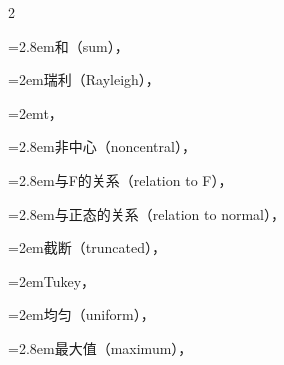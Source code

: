 \begin{multicols}{2}
\par\noindent\hangindent=2.8em\hspace*{1.8em}\label{idx:379}和（sum），\hyperref[thm:4.3.2]{\pageref*{thm:4.3.2}}\par
\par\noindent\hangindent=2em\hspace*{1em}\label{idx:380}瑞利（Rayleigh），\hyperref[idxocc:380:139]{\pageref*{idxocc:380:139}}\par
\par\noindent\hangindent=2em\hspace*{1em}\label{idx:381}t，\hyperref[def:5.3.4]{\pageref*{def:5.3.4}}\par
\par\noindent\hangindent=2.8em\hspace*{1.8em}\label{idx:382}非中心（noncentral），\hyperref[exercise:8.35]{\pageref*{exercise:8.35}}\par
\par\noindent\hangindent=2.8em\hspace*{1.8em}\label{idx:383}与F的关系（relation to F），\hyperref[thm:5.3.8]{\pageref*{thm:5.3.8}}\par
\par\noindent\hangindent=2.8em\hspace*{1.8em}\label{idx:384}与正态的关系（relation to normal），\hyperref[exercise:5.18]{\pageref*{exercise:5.18}}\par
\par\noindent\hangindent=2em\hspace*{1em}\label{idx:385}截断（truncated），\hyperref[exercise:3.13]{\pageref*{exercise:3.13}}\par
\par\noindent\hangindent=2em\hspace*{1em}\label{idx:386}Tukey，\hyperref[exercise:10.23]{\pageref*{exercise:10.23}}\par
\par\noindent\hangindent=2em\hspace*{1em}\label{idx:387}均匀（uniform），\hyperref[eq:3.3.1]{\pageref*{eq:3.3.1}}\par
\par\noindent\hangindent=2.8em\hspace*{1.8em}\label{idx:388}最大值（maximum），\hyperref[ex:5.5.11]{\pageref*{ex:5.5.11}}\par

\end{multicols}
